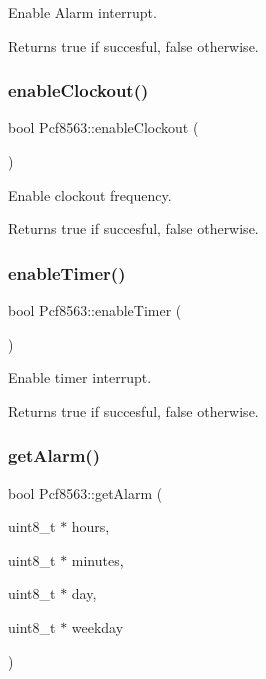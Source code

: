 Enable Alarm interrupt. 

\begin{DoxyReturn}{Returns}
true if succesful, false otherwise. 
\end{DoxyReturn}
\mbox{\label{namespacePcf8563_a03e4ea0f00fd48664537788ba491fa60}} 
\subsubsection{\texorpdfstring{enable\+Clockout()}{enableClockout()}}
{\footnotesize\ttfamily bool Pcf8563\+::enable\+Clockout (\begin{DoxyParamCaption}{ }\end{DoxyParamCaption})}



Enable clockout frequency. 

\begin{DoxyReturn}{Returns}
true if succesful, false otherwise. 
\end{DoxyReturn}
\mbox{\label{namespacePcf8563_af4cc94d1ea73bbff5d44e1b716111cdb}} 
\subsubsection{\texorpdfstring{enable\+Timer()}{enableTimer()}}
{\footnotesize\ttfamily bool Pcf8563\+::enable\+Timer (\begin{DoxyParamCaption}{ }\end{DoxyParamCaption})}



Enable timer interrupt. 

\begin{DoxyReturn}{Returns}
true if succesful, false otherwise. 
\end{DoxyReturn}
\mbox{\label{namespacePcf8563_a687f6854cf03080456bdd8596c1c60ff}} 
\subsubsection{\texorpdfstring{get\+Alarm()}{getAlarm()}}
{\footnotesize\ttfamily bool Pcf8563\+::get\+Alarm (\begin{DoxyParamCaption}\item[{uint8\+\_\+t $\ast$}]{hours,  }\item[{uint8\+\_\+t $\ast$}]{minutes,  }\item[{uint8\+\_\+t $\ast$}]{day,  }\item[{uint8\+\_\+t $\ast$}]{weekday }\end{DoxyParamCaption})}



